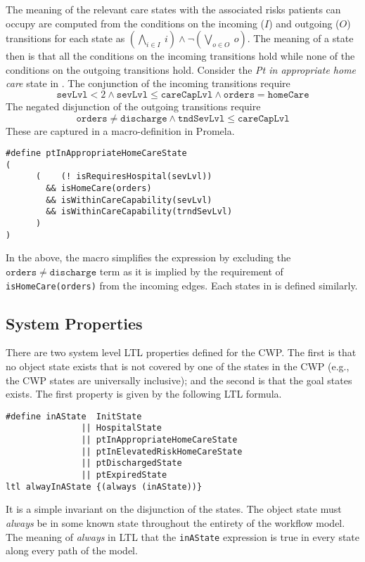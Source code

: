 The meaning of the relevant care states with the associated risks patients can occupy are computed from the conditions on the incoming ($I$) and outgoing ($O$) transitions for each state as $(\bigwedge_{i \in I}\ i) \wedge \neg(\bigvee_{o \in O}\ o)$. The meaning of a state then is that all the conditions on the incoming transitions hold while none of the conditions on the outgoing transitions hold. Consider the \emph{Pt in appropriate home care} state in . The conjunction of the incoming transitions require
%
\[
  \mathtt{sevLvl} < 2 \wedge \mathtt{sevLvl} \le \mathtt{careCapLvl} \wedge \mathtt{orders} = \mathtt{homeCare}
\]
%
The negated disjunction of the outgoing transitions require
%
\[
  \mathtt{orders} \neq \mathtt{discharge} \wedge \mathtt{tndSevLvl} \le \mathtt{careCapLvl}
\]
%
\noindent These are captured in a macro-definition in Promela.
%
{\small
\begin{lstlisting}[style=myPromela]
#define ptInAppropriateHomeCareState
(
      (    (! isRequiresHospital(sevLvl))
        && isHomeCare(orders)                                      
        && isWithinCareCapability(sevLvl)
        && isWithinCareCapability(trndSevLvl)
      )
)
\end{lstlisting}
}
%
\noindent In the above, the macro simplifies the expression by excluding the $\mathtt{orders} \neq \mathtt{discharge}$ term as it is implied by the requirement of \texttt{isHomeCare(orders)} from the incoming edges. Each states in  is defined similarly.

\subsection{System Properties}
There are two system level LTL properties defined for the CWP. The first is that no object state exists that is not covered by one of the states in the CWP (e.g., the CWP states are universally inclusive); and the second is that the goal states exists. The first property is given by the following LTL formula.
%
{\small
\begin{lstlisting}[style=myPromela]
#define inAState  InitState
               || HospitalState
               || ptInAppropriateHomeCareState
               || ptInElevatedRiskHomeCareState
               || ptDischargedState
               || ptExpiredState
ltl alwayInAState {(always (inAState))}
\end{lstlisting}
}
%
\noindent It is a simple invariant on the disjunction of the states. The object state must \emph{always} be in some known state throughout the entirety of the workflow model. The meaning of \emph{always} in LTL that the \texttt{inAState} expression is true in every state along every path of the model.


